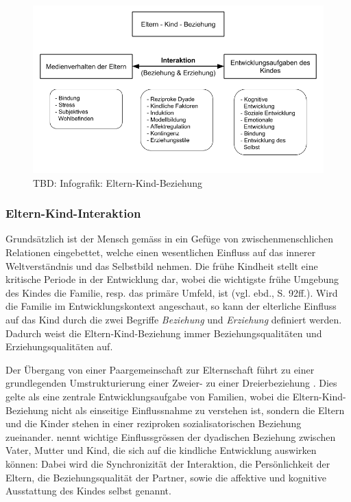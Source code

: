 \begin{figure}%
  \centering
     \includegraphics[width=1.0\textwidth]{content/Grafik/Infografik_ElternKindBeziehung_Uebersicht.png}
  \caption{TBD: Infografik: Eltern-Kind-Beziehung}
  \label{fig:InfografikElternKindBeziehung}
\end{figure}

\subsubsection{Eltern-Kind-Interaktion}\label{sec:Interaktion}
Grundsätzlich ist der Mensch gemäss  in ein Gefüge von zwischenmenschlichen Relationen eingebettet, welche einen wesentlichen Einfluss auf das innerer Weltverständnis und das Selbstbild nehmen.  Die frühe Kindheit stellt eine kritische Periode in der Entwicklung dar, wobei die wichtigste frühe Umgebung des Kindes die Familie, resp. das primäre Umfeld, ist (vgl. ebd., S. 92ff.). Wird die Familie im Entwicklungskontext angeschaut, so kann der elterliche Einfluss auf das Kind durch die zwei Begriffe \textit{Beziehung} und \textit{Erziehung} definiert werden. Dadurch weist die Eltern-Kind-Beziehung immer Beziehungsqualitäten und Erziehungsqualitäten auf.  

Der Übergang von einer Paargemeinschaft zur Elternschaft führt zu einer grundlegenden Umstrukturierung einer Zweier- zu einer Dreierbeziehung \cite{Hofer1992, Buergin1998}. Dies gelte als eine zentrale Entwicklungsaufgabe von Familien, wobei die Eltern-Kind-Beziehung nicht als einseitige Einflussnahme zu verstehen ist, sondern die Eltern und die Kinder stehen in einer reziproken sozialisatorischen Beziehung zueinander.  nennt wichtige Einflussgrössen der dyadischen Beziehung zwischen Vater, Mutter und Kind, die sich auf die kindliche Entwicklung auswirken können: Dabei wird die Synchronizität der Interaktion, die Persönlichkeit der Eltern, die Beziehungsqualität der Partner, sowie die affektive und kognitive Ausstattung des Kindes selbst genannt. 

